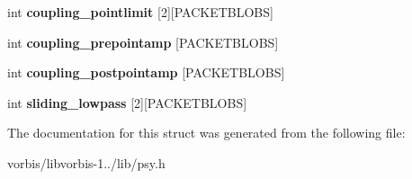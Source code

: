 \begin{DoxyCompactItemize}
\item 
\hypertarget{structvorbis__info__psy__global_a1f9a75e3bd47d5f025d89cd17c3100f2}{int {\bfseries coupling\+\_\+pointlimit} \mbox{[}2\mbox{]}\mbox{[}P\+A\+C\+K\+E\+T\+B\+L\+O\+B\+S\mbox{]}}\label{structvorbis__info__psy__global_a1f9a75e3bd47d5f025d89cd17c3100f2}

\item 
\hypertarget{structvorbis__info__psy__global_a42cf86f4d73118ff0e6af63cf1f96b1b}{int {\bfseries coupling\+\_\+prepointamp} \mbox{[}P\+A\+C\+K\+E\+T\+B\+L\+O\+B\+S\mbox{]}}\label{structvorbis__info__psy__global_a42cf86f4d73118ff0e6af63cf1f96b1b}

\item 
\hypertarget{structvorbis__info__psy__global_a308dce72e7dc0a4ad1f33fc760f454f0}{int {\bfseries coupling\+\_\+postpointamp} \mbox{[}P\+A\+C\+K\+E\+T\+B\+L\+O\+B\+S\mbox{]}}\label{structvorbis__info__psy__global_a308dce72e7dc0a4ad1f33fc760f454f0}

\item 
\hypertarget{structvorbis__info__psy__global_a5d1433d9b0be686fcb7e9a9060457118}{int {\bfseries sliding\+\_\+lowpass} \mbox{[}2\mbox{]}\mbox{[}P\+A\+C\+K\+E\+T\+B\+L\+O\+B\+S\mbox{]}}\label{structvorbis__info__psy__global_a5d1433d9b0be686fcb7e9a9060457118}

\end{DoxyCompactItemize}


The documentation for this struct was generated from the following file\+:\begin{DoxyCompactItemize}
\item 
vorbis/libvorbis-\/1../lib/psy.\+h\end{DoxyCompactItemize}

